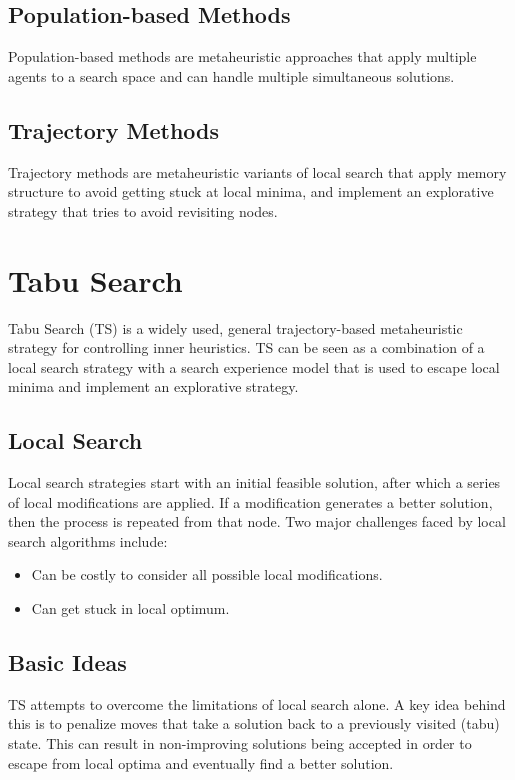 \documentclass[12pt,titlepage]{article}
\let\stdsection\section
\renewcommand\section{\clearpage\stdsection}
\begin{document}
    \subsection{Population-based Methods}
      Population-based methods are metaheuristic approaches that apply multiple agents to a search space and can handle multiple simultaneous solutions.

    \subsection{Trajectory Methods}
      Trajectory methods are metaheuristic variants of local search that apply memory structure to avoid getting stuck at local minima, and implement an explorative
      strategy that tries to avoid revisiting nodes.

  \section{Tabu Search}
    Tabu Search (TS) is a widely used, general trajectory-based metaheuristic strategy for controlling inner heuristics. TS can be seen as a combination of a local
    search strategy with a search experience model that is used to escape local minima and implement an explorative strategy.

    \subsection{Local Search}
      Local search strategies start with an initial feasible solution, after which a series of local modifications are applied. If a modification generates a better solution,
      then the process is repeated from that node. Two major challenges faced by local search algorithms include:
      \begin{itemize}
        \item Can be costly to consider all possible local modifications. 
        \item Can get stuck in local optimum.
      \end{itemize}

    \subsection{Basic Ideas}
      TS attempts to overcome the limitations of local search alone. A key idea behind this is to penalize moves that take a solution back to a previously visited (tabu) state.
      This can result in non-improving solutions being accepted in order to escape from local optima and eventually find a better solution.
\end{document}
